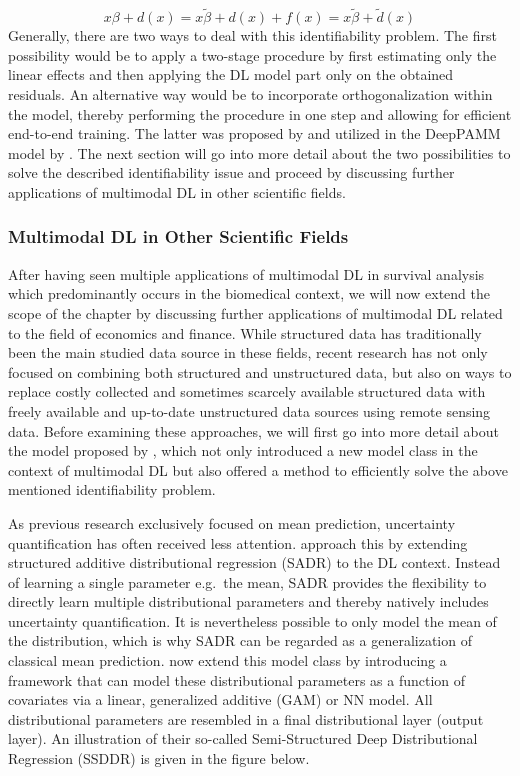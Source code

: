 \documentclass[
]{krantz}
\begin{document}
\[
x\beta + d(x) = x\widetilde{\beta} + d(x) + f(x) = x\widetilde{\beta} + \widetilde{d}(x)
\]
Generally, there are two ways to deal with this identifiability problem. The first possibility would be to apply a two-stage procedure by first estimating only the linear effects and then applying the DL model part only on the obtained residuals. An alternative way would be to incorporate orthogonalization within the model, thereby performing the procedure in one step and allowing for efficient end-to-end training. The latter was proposed by \citet{SSDDR2020} and utilized in the DeepPAMM model by \citet{DeepPAMM2022}. The next section will go into more detail about the two possibilities to solve the described identifiability issue and proceed by discussing further applications of multimodal DL in other scientific fields.

\hypertarget{multimodal-dl-in-other-scientific-fields}{%
\subsubsection{Multimodal DL in Other Scientific Fields}\label{multimodal-dl-in-other-scientific-fields}}

After having seen multiple applications of multimodal DL in survival analysis which predominantly occurs in the biomedical context, we will now extend the scope of the chapter by discussing further applications of multimodal DL related to the field of economics and finance. While structured data has traditionally been the main studied data source in these fields, recent research has not only focused on combining both structured and unstructured data, but also on ways to replace costly collected and sometimes scarcely available structured data with freely available and up-to-date unstructured data sources using remote sensing data. Before examining these approaches, we will first go into more detail about the model proposed by \citet{SSDDR2020}, which not only introduced a new model class in the context of multimodal DL but also offered a method to efficiently solve the above mentioned identifiability problem.

As previous research exclusively focused on mean prediction, uncertainty quantification has often received less attention. \citet{SSDDR2020} approach this by extending structured additive distributional regression (SADR) to the DL context. Instead of learning a single parameter e.g.~the mean, SADR provides the flexibility to directly learn multiple distributional parameters and thereby natively includes uncertainty quantification. It is nevertheless possible to only model the mean of the distribution, which is why SADR can be regarded as a generalization of classical mean prediction. \citet{SSDDR2020} now extend this model class by introducing a framework that can model these distributional parameters as a function of covariates via a linear, generalized additive (GAM) or NN model. All distributional parameters are resembled in a final distributional layer (output layer). An illustration of their so-called Semi-Structured Deep Distributional Regression (SSDDR) is given in the figure below.
\end{document}

